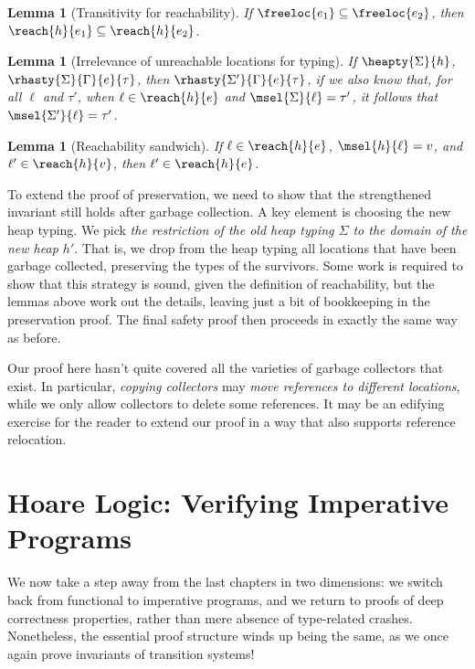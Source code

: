 \documentclass{amsbook}
\newtheorem{lemma}[theorem]{Lemma}
\theoremstyle{definition}
\theoremstyle{remark}
\numberwithin{section}{chapter}
\numberwithin{equation}{chapter}
\begin{document}
\begin{lemma}[Transitivity for reachability]
  If $\freeloc{e_1} \subseteq \freeloc{e_2}$, then $\reach{h}{e_1} \subseteq \reach{h}{e_2}$.
\end{lemma}

\begin{lemma}[Irrelevance of unreachable locations for typing]
  If $\heapty{\Sigma}{h}$, $\rhasty{\Sigma}{\Gamma}{e}{\tau}$, then $\rhasty{\Sigma'}{\Gamma}{e}{\tau}$, if we also know that, for all $\ell$ and $\tau'$, when $\ell \in \reach{h}{e}$ and $\msel{\Sigma}{\ell} = \tau'$, it follows that $\msel{\Sigma'}{\ell} = \tau'$.
\end{lemma}

\begin{lemma}[Reachability sandwich]
  If $\ell \in \reach{h}{e}$, $\msel{h}{\ell} = v$, and $\ell' \in \reach{h}{v}$, then $\ell' \in \reach{h}{e}$.
\end{lemma}

To extend the proof of preservation, we need to show that the strengthened invariant still holds after garbage collection.
A key element is choosing the new heap typing.
We pick \emph{the restriction of the old heap typing $\Sigma$ to the domain of the new heap $h'$}.
That is, we drop from the heap typing all locations that have been garbage collected, preserving the types of the survivors.
Some work is required to show that this strategy is sound, given the definition of reachability, but the lemmas above work out the details, leaving just a bit of bookkeeping in the preservation proof.
The final safety proof then proceeds in exactly the same way as before.

Our proof here hasn't quite covered all the varieties of garbage collectors that exist.
In particular, \emph{copying collectors} may \emph{move references to different locations}, while we only allow collectors to delete some references.
It may be an edifying exercise for the reader to extend our proof in a way that also supports reference relocation.



\chapter{Hoare Logic: Verifying Imperative Programs}

We now take a step away from the last chapters in two dimensions: we switch back from functional to imperative programs, and we return to proofs of deep correctness properties, rather than mere absence of type-related crashes.
Nonetheless, the essential proof structure winds up being the same, as we once again prove invariants of transition systems!
\end{document}

